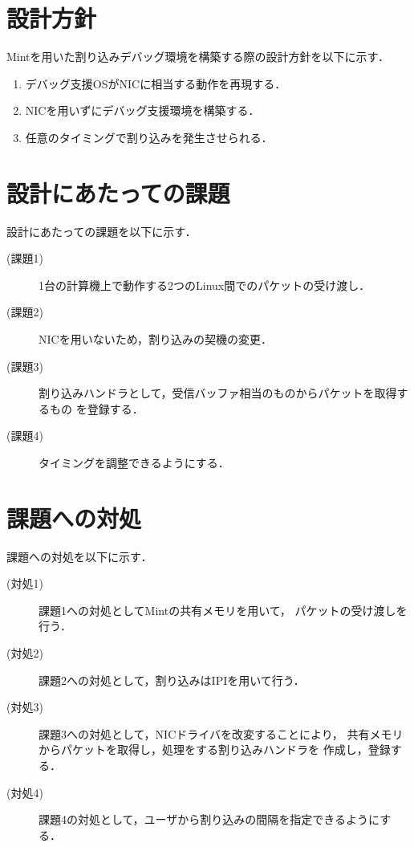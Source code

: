 \documentclass[tanilab-enum]{graduate}
\begin{document}
\section{設計方針}
Mintを用いた割り込みデバッグ環境を構築する際の設計方針を以下に示す．
\begin{enumerate}
    \item デバッグ支援OSがNICに相当する動作を再現する．
    \item NICを用いずにデバッグ支援環境を構築する．
    \item 任意のタイミングで割り込みを発生させられる．
\end{enumerate}
\section{設計にあたっての課題}
設計にあたっての課題を以下に示す．
\begin{description}
    \item[(課題1)] 1台の計算機上で動作する2つのLinux間でのパケットの受け渡し．
    \item[(課題2)] NICを用いないため，割り込みの契機の変更．
    \item[(課題3)] 割り込みハンドラとして，受信バッファ相当のものからパケットを取得するもの
        を登録する．
    \item[(課題4)] タイミングを調整できるようにする．
\end{description}

\section{課題への対処}
課題への対処を以下に示す．
\begin{description}
    \item[(対処1)]課題1への対処としてMintの共有メモリを用いて，
        パケットの受け渡しを行う．
    \item[(対処2)]課題2への対処として，割り込みはIPIを用いて行う．
    \item[(対処3)]課題3への対処として，NICドライバを改変することにより，
        共有メモリからパケットを取得し，処理をする割り込みハンドラを
        作成し，登録する．
    \item[(対処4)]課題4の対処として，ユーザから割り込みの間隔を指定できるようにする．
\end{description}
\end{document}
